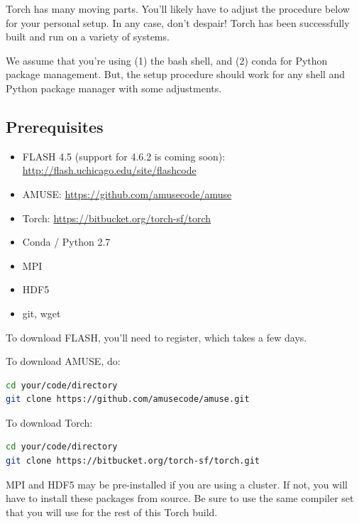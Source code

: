 \documentclass[10pt]{article}
\begin{document}
Torch has many moving parts.  You'll likely have to adjust the procedure below
for your personal setup.  In any case, don't despair!  Torch has been
successfully built and run on a variety of systems.

We assume that you're using (1) the bash shell, and (2) conda for Python
package management.  But, the setup procedure should work for any shell and
Python package manager with some adjustments.

\subsection{Prerequisites}

\begin{itemize}
\item FLASH 4.5 (support for 4.6.2 is coming soon): \url{http://flash.uchicago.edu/site/flashcode}
\item AMUSE: \url{https://github.com/amusecode/amuse}
\item Torch: \url{https://bitbucket.org/torch-sf/torch}
\item Conda / Python 2.7
\item MPI
\item HDF5
\item git, wget
\end{itemize}

To download FLASH, you'll need to register, which takes a few days.

To download AMUSE, do:
\begin{lstlisting}[language=bash]
cd your/code/directory
git clone https://github.com/amusecode/amuse.git
\end{lstlisting}

To download Torch:
\begin{lstlisting}[language=bash]
cd your/code/directory
git clone https://bitbucket.org/torch-sf/torch.git
\end{lstlisting}

MPI and HDF5 may be pre-installed if you are using a cluster.  If not, you will
have to install these packages from source.  Be sure to use the same compiler
set that you will use for the rest of this Torch build.
\end{document}
